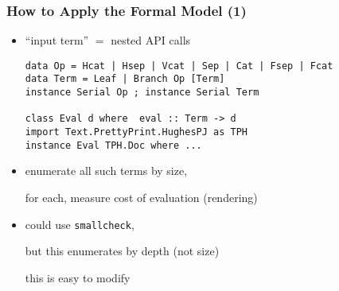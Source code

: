 \begin{frame}[fragile]
\frametitle{How to Apply the Formal Model (1)}

  \begin{itemize}[<+->]
  \item ``input term'' $=$ nested API calls

\begin{verbatim}
data Op = Hcat | Hsep | Vcat | Sep | Cat | Fsep | Fcat
data Term = Leaf | Branch Op [Term]
instance Serial Op ; instance Serial Term

class Eval d where  eval :: Term -> d 
import Text.PrettyPrint.HughesPJ as TPH 
instance Eval TPH.Doc where ...
\end{verbatim}

  \item enumerate all such terms by size,

    for each, measure cost of evaluation (rendering)

  \item could use \texttt{smallcheck}, 

    but this enumerates by depth (not size) 

    this is easy to modify

  \end{itemize}
\end{frame}
